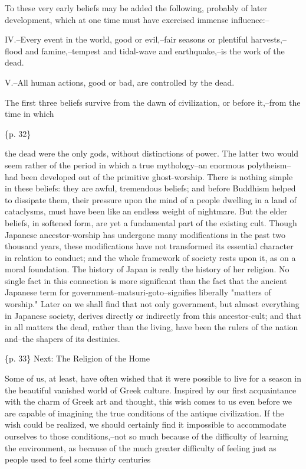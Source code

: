 To these very early beliefs may be added the following, probably of later development, which at one time must have exercised immense influence:--

IV.--Every event in the world, good or evil,--fair seasons or plentiful harvests,--flood and famine,--tempest and tidal-wave and earthquake,--is the work of the dead.

V.--All human actions, good or bad, are controlled by the dead.



The first three beliefs survive from the dawn of civilization, or before it,--from the time in which

\{p. 32\}

the dead were the only gods, without distinctions of power. The latter two would seem rather of the period in which a true mythology--an enormous polytheism--had been developed out of the primitive ghost-worship. There is nothing simple in these beliefs: they are awful, tremendous beliefs; and before Buddhism helped to dissipate them, their pressure upon the mind of a people dwelling in a land of cataclysms, must have been like an endless weight of nightmare. But the elder beliefs, in softened form, are yet a fundamental part of the existing cult. Though Japanese ancestor-worship has undergone many modifications in the past two thousand years, these modifications have not transformed its essential character in relation to conduct; and the whole framework of society rests upon it, as on a moral foundation. The history of Japan is really the history of her religion. No single fact in this connection is more significant than the fact that the ancient Japanese term for government--matsuri-goto--signifies liberally "matters of worship." Later on we shall find that not only government, but almost everything in Japanese society, derives directly or indirectly from this ancestor-cult; and that in all matters the dead, rather than the living, have been the rulers of the nation and--the shapers of its destinies.

\{p. 33\}
Next: The Religion of the Home

Some of us, at least, have often wished that it were possible to live for a season in the beautiful vanished world of Greek culture. Inspired by our first acquaintance with the charm of Greek art and thought, this wish comes to us even before we are capable of imagining the true conditions of the antique civilization. If the wish could be realized, we should certainly find it impossible to accommodate ourselves to those conditions,--not so much because of the difficulty of learning the environment, as because of the much greater difficulty of feeling just as people used to feel some thirty centuries

